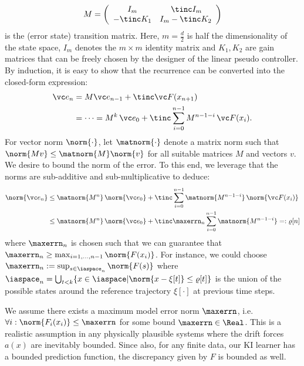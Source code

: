 \begin{equation}
	M = \left(\begin{array}[h]{cc}
				I_m &  \, \tinc I_{m}\\
				-\tinc K_1 & I_m- \tinc K_2 
						\end{array}\right) 
\end{equation}
					is the (error state) transition matrix. 	
Here, $m = \frac d 2$ is half the dimensionality of the state space, $I_m$ denotes the $m \times m$ identity matrix and $K_1,K_2$ are gain matrices that can be freely chosen by the designer of the linear pseudo controller.		
By induction, it is easy to show that the recurrence can be converted into the closed-form expression:
\begin{align*}
	\vc e_n &= M \vc e_{n-1} + \tinc \vc F(x_{n+1})  \\ 
	&= \dots= M^k \, \vc e_0 + \tinc \sum_{i=0}^{n-1} M^{n-1-i} \, \vc F(x_i)	.	
\end{align*}	
For vector norm $\norm{\cdot}$, let $\matnorm{\cdot}$ denote a matrix norm such that $\norm{Mv} \leq \matnorm{M} \norm{v}$ for all suitable matrices $M$ and vectors $v$.
We desire to bound the  norm of the error. To this end, we leverage that the norms are sub-additive and sub-multiplicative to deduce: 
\begin{align*}
	\norm{\vc e_n} &\leq   \matnorm{M^{n}} \, \norm{\vc e_0} + \tinc \sum_{i=0}^{n-1}  \matnorm{M^{n-1-i}} \, \norm{\vc F(x_i)}		\\
	&\leq \matnorm{M^{n}} \, \norm{\vc e_0} + \tinc \maxerrn_n	 \sum_{i=0}^{n-1}  \matnorm{M^{n-1-i}} =: \varrho[n]
\end{align*}
where  $\maxerrn_n$ is chosen such that we can guarantee that $\maxerrn_n	\geq \max_{i=1,...,n-1} \norm{F(x_i)}$.
For instance, we could choose $\maxerrn_n := \sup_{s \in \iaspace_n} \norm{F(s)} $
	where $\iaspace_n = \bigcup_{t< k} \{x \in \iaspace | \norm{x - \xi[t]} \leq \varrho[t] \}$ is the union of the possible states around the reference trajectory $\xi[\cdot]$ at previous time steps.
\begin{remark}	 
We assume there exists a maximum model error norm $\maxerrn$, i.e. $\forall i: \norm{F_i(x_i)} \leq \maxerrn$ for some bound $\maxerrn \in \Real$.
This is a realistic assumption in any physically plausible systems where the drift forces $a(x)$ are inevitably bounded. Since also, for any finite data, our KI learner has a bounded prediction function, the discrepancy given by $F$ is bounded as well. 
\label{rem:bnd_err_innovations}
\end{remark}

